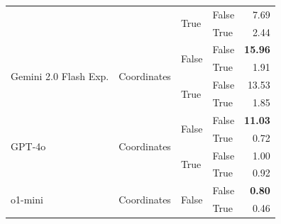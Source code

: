 \begin{tabular}{@{}llllr@{}}
                                                                        &                                   & \multirow[c]{2}{*}{True}  & False                     & 7.69 \\
                                                                        &                                   &                           & True                      & 2.44 \\
    \midrule
    \multirow[c]{4}{*}{Gemini 2.0 Flash Exp.}                           & \multirow[c]{4}{*}{Coordinates}   & \multirow[c]{2}{*}{False} & False                     & \textbf{15.96} \\
                                                                        &                                   &                           & True                      & 1.91  \\
                                                                        &                                   & \multirow[c]{2}{*}{True}  & False                     & 13.53 \\
                                                                        &                                   &                           & True                      & 1.85  \\
    \midrule                                
    \multirow[c]{4}{*}{GPT-4o}                                          & \multirow[c]{4}{*}{Coordinates}   & \multirow[c]{2}{*}{False} & False                     & \textbf{11.03} \\
                                                                        &                                   &                           & True                      & 0.72 \\
                                                                        &                                   & \multirow[c]{2}{*}{True}  & False                     & 1.00 \\
                                                                        &                                   &                           & True                      & 0.92 \\
    \midrule                                        
    \multirow[c]{4}{*}{o1-mini}                                         & \multirow[c]{4}{*}{Coordinates}   & \multirow[c]{2}{*}{False} & False                     & \textbf{0.80} \\
                                                                        &                                   &                           & True                      & 0.46 \\

\end{tabular}
